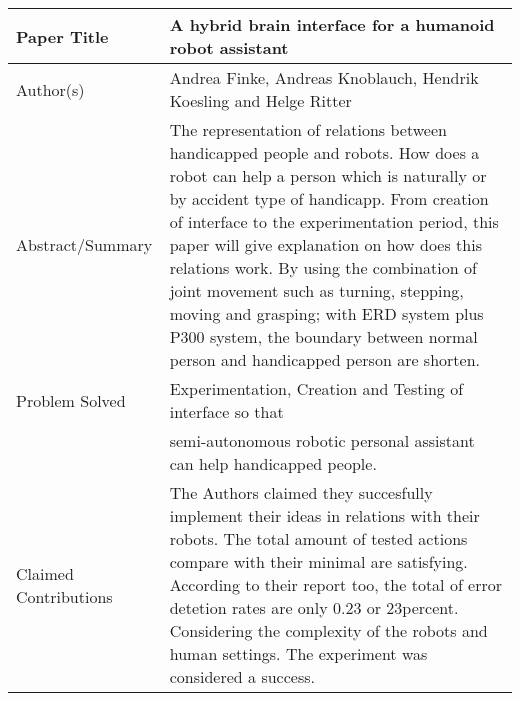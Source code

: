\documentclass[a4paper, 12pt]{article}
\begin{document}
\setcounter{page}{1}
\begin{tabular}{| m{12em} | m{28em} |} 

\hline

Paper Title & A hybrid brain interface for a humanoid robot assistant \\
\hline

Author(s) & Andrea Finke, Andreas Knoblauch, Hendrik Koesling and Helge Ritter \\
\hline

Abstract/Summary & The representation of relations between handicapped people and robots. How does a robot can help a person which is naturally or by accident type of handicapp. From creation of interface to the experimentation period, this paper will give explanation on how does this relations work. By using the combination of joint movement such as turning, stepping, moving and grasping; with ERD system plus P300 system, the boundary between normal person and handicapped person are shorten. \\
\hline

Problem Solved 
& Experimentation, Creation and Testing of interface so that \\ 
& semi-autonomous robotic personal assistant can help handicapped people. \\
\hline

Claimed Contributions &
The Authors claimed they succesfully implement their ideas in relations with their robots. The total amount of tested actions compare with their minimal are satisfying. According to their report too, the total of error detetion rates are only 0.23 or 23percent. Considering the complexity of the robots and human settings. The experiment was considered a success.  \\
\hline


\end{tabular}
\end{document}
